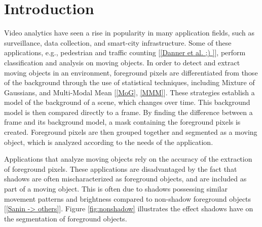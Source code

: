 \clearpage
\chapter{Introduction}

Video analytics have seen a rise in popularity in many application fields, such as surveillance, data collection, and smart-city infrastructure. Some of these applications, e.g., pedestrian and traffic counting [\ref{Danner et al. ;) }], perform classification and analysis on moving objects. In order to detect and extract moving objects in an environment, foreground pixels are differentiated from those of the background through the use of statistical techniques, including Mixture of Gaussians, and Multi-Modal Mean [\ref{MoG}, \ref{MMM}]. These strategies establish a model of the background of a scene, which changes over time. This background model is then compared directly to a frame. By finding the difference between a frame and its background model, a mask containing the foreground pixels is created. Foreground pixels are then grouped together and segmented as a moving object, which is analyzed according to the needs of the application.

Applications that analyze moving objects rely on the accuracy of the extraction of foreground pixels. These applications are disadvantaged by the fact that shadows are often mischaracterized as foreground objects, and are included as part of a moving object. This is often due to shadows possessing similar movement patterns and brightness compared to non-shadow foreground objects [\ref{Sanin -> others}]. Figure \ref{fig:nonshadow} illustrates the effect shadows have on the segmentation of foreground objects. 

